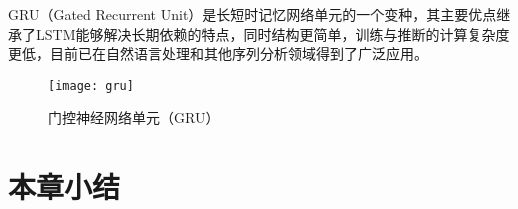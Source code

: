 GRU（Gated Recurrent Unit）\cite{GRU}是长短时记忆网络单元的一个变种，其主要优点继承了LSTM能够解决长期依赖的特点，同时结构更简单，训练与推断的计算复杂度更低，目前已在自然语言处理和其他序列分析领域得到了广泛应用。
\begin{figure}[htp]
\centering
\texttt{[image: gru]}
\caption{门控神经网络单元（GRU）}
\label{fig:gru}
\end{figure}





\section{本章小结}